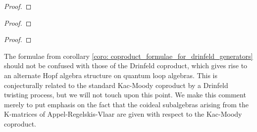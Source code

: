         \begin{lemma} \label{lemma: drinfeld_current_presentation_for_loop_QUEs}
        \end{lemma}
            \begin{proof}
                
            \end{proof}
        \begin{corollary} \label{coro: triangular_decomposition_for_loop_QUEs}
            
        \end{corollary}
            \begin{proof}
                
            \end{proof}
        \begin{corollary} \label{coro: coproduct_formulae_for_drinfeld_generators}
            
        \end{corollary}
            \begin{proof}
                
            \end{proof}
        \begin{remark}
            The formulae from corollary \ref{coro: coproduct_formulae_for_drinfeld_generators} should not be confused with those of the Drinfeld coproduct, which gives rise to an alternate Hopf algebra structure on quantum loop algebras. This is conjecturally related to the standard Kac-Moody coproduct by a Drinfeld twisting process, but we will not touch upon this point. We make this comment merely to put emphasis on the fact that the coideal subalgebras arising from the K-matrices of Appel-Regelskis-Vlaar are given with respect to the Kac-Moody coproduct. 
        \end{remark}